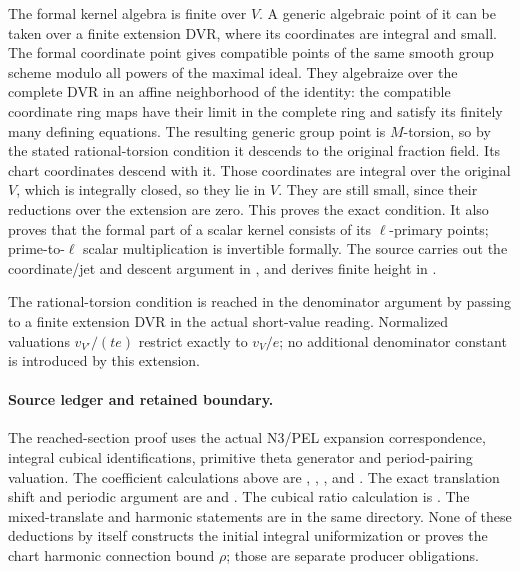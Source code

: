 The formal kernel algebra is finite over \(V\).
A generic algebraic point of it can be taken over a finite extension
DVR, where its coordinates are integral and small.
The formal coordinate point gives compatible points of the same
smooth group scheme modulo all powers of the maximal ideal.
They algebraize over the complete DVR in an affine neighborhood of
the identity: the compatible coordinate ring maps have their limit
in the complete ring and satisfy its finitely many defining equations.
The resulting generic group point is \(M\)-torsion, so by the stated
rational-torsion condition it descends to the original fraction field.
Its chart coordinates descend with it.
Those coordinates are integral over the original \(V\), which is
integrally closed, so they lie in \(V\).
They are still small, since their reductions over the extension are
zero.  This proves the exact  condition.
It also proves that the formal part of a scalar kernel consists of
its \(\ell\)-primary points; prime-to-\(\ell\) scalar multiplication
is invertible formally.
The source carries out the coordinate/jet and descent argument in
, and derives finite
height in .

The rational-torsion condition is reached in the denominator argument
by passing to a finite extension DVR in the actual short-value
reading.  Normalized valuations \(v_{V'}/(te)\) restrict exactly to
\(v_V/e\); no additional denominator constant is introduced by this
extension.

\paragraph{Source ledger and retained boundary.}
The reached-section proof uses the actual N3/PEL expansion
correspondence, integral cubical identifications, primitive theta
generator and period-pairing valuation.
The coefficient calculations above are
,
,
, and
.
The exact translation shift and periodic argument are
and .
The cubical ratio calculation is
.
The mixed-translate and harmonic statements are in the same
 directory.
None of these deductions by itself constructs the initial integral
uniformization or proves the chart harmonic connection bound
\(\rho\); those are separate producer obligations.


